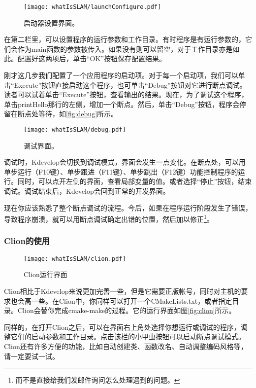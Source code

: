 \begin{figure}[!ht]
	\centering
	\texttt{[image: whatIsSLAM/launchConfigure.pdf]}
	\caption{启动器设置界面。}
	\label{fig:launchConfigure}
\end{figure}

在第二栏里，可以设置程序的运行参数和工作目录。有时程序是有运行参数的，它们会作为main函数的参数被传入。如果没有则可以留空，对于工作目录亦是如此。配置好这两项后，单击“OK”按钮保存配置结果。

刚才这几步我们配置了一个应用程序的启动项。对于每一个启动项，我们可以单击“Execute”按钮直接启动这个程序，也可单击“Debug”按钮对它进行断点调试。读者可以试着单击“Execute”按钮，查看输出的结果。现在，为了调试这个程序，单击printHello那行的左侧，增加一个断点。然后，单击“Debug”按钮，程序会停留在断点处等待，如\autoref{fig:debug}所示。

\begin{figure}[!htp]
	\centering
	\texttt{[image: whatIsSLAM/debug.pdf]}
	\caption{调试界面。}
	\label{fig:debug}
\end{figure}

调试时，Kdevelop会切换到调试模式，界面会发生一点变化。在断点处，可以用单步运行（F10键）、单步跟进（F11键）、单步跳出（F12键）功能控制程序的运行。同时，可以点开左侧的界面，查看局部变量的值。或者选择“停止”按钮，结束调试。调试结束后，Kdevelop会回到正常的开发界面。

现在你应该熟悉了整个断点调试的流程。今后，如果在程序运行阶段发生了错误，导致程序崩溃，就可以用断点调试确定出错的位置，然后加以修正\footnote{而不是直接给我们发邮件询问怎么处理遇到的问题。}。

\subsubsection{Clion的使用}
\begin{figure}[!t]
	\centering
	\texttt{[image: whatIsSLAM/clion.pdf]}
	\caption{Clion运行界面}
	\label{fig:clion}
\end{figure}
Clion相比于Kdevelop来说更加完善一些，但是它需要正版帐号，同时对主机的要求也会高一些。在Clion中，你同样可以打开一个CMakeLists.txt，或者指定目录。Clion会替你完成cmake-make的过程。它的运行界面如图\autoref{fig:clion}所示。

同样的，在打开Clion之后，可以在界面右上角处选择你想运行或调试的程序，调整它们的启动参数和工作目录。点击该栏的小甲虫按钮可以启动断点调试模式。Clion还有许多方便的功能，比如自动创建类、函数改名、自动调整编码风格等，请一定要试一试。

